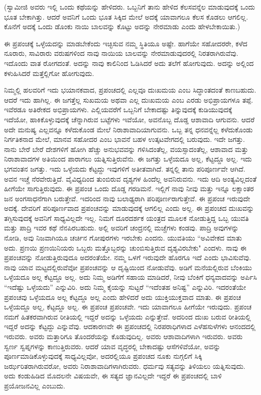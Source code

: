 (ಸ್ವಾಮೀಜಿ ಅವರು ಇಲ್ಲಿ ಒಂದು ಕಥೆಯನ್ನು ಹೇಳಿದರು. ಒಬ್ಬನಿಗೆ ತಾನು ಹೇಳಿದ ಕೆಲಸವನ್ನೆಲ ಮಾಡುವುದಕ್ಕೆ ಒಂದು ಭೂತ ಬೇಕಾಗಿತ್ತು. ಆದರೆ ಅವನಿಗೆ ಒಂದು ಭೂತ ಸಿಕ್ಕಿದ ಮೇಲೆ ಅದಕ್ಕೆ ಯಾವಾಗಲೂ ಕೆಲಸ ಕೊಡಲು ಆಗಲಿಲ್ಲ. ಕೊನೆಗೆ ಅದಕ್ಕೆ ಒಂದು ಡೊಂಕು ನಾಯಿ ಬಾಲವನ್ನು ಕೊಟ್ಟು ಅದನ್ನು ನೇರಮಾಡು ಎಂದು ಹೇಳಬೇಕಾಯಿತು.)

ಈ ಪ್ರಪಂಚಕ್ಕೆ ಒಳ್ಳೆಯದನ್ನು ಮಾಡಬೇಕೆಂದು ಇಚ್ಛಿಸುವ ನಮ್ಮ ಸ್ಥಿತಿಯೂ ಅಷ್ಟೇ. ಹಾಗೆಯೇ ಸಹೋದರರೇ, ಕಳೆದ ನೂರಾರು, ಸಾವಿರಾರು ವರುಷಗಳಿಂದ ನಾವು ನಾಯಿಯ ಬಾಲವನ್ನು ನೇರಮಾಡುವುದರಲ್ಲಿ ನಿರತರಾಗಿರುವೆವು. ಇದೊಂದು ವಾತ ರೋಗದಂತೆ. ಅದನ್ನು ನಾವು ಕಾಲಿನಿಂದ ಓಡಿಸಿದರೆ ಅದು ತಲೆಗೆ ಹೋಗುವುದು. ಅದನ್ನು ಅಲ್ಲಿಂದ ಕಳುಹಿಸಿದರೆ ಮತ್ತೆಲ್ಲಿಗೋ ಹೋಗುವುದು.

ನಿಮ್ಮಲ್ಲಿ ಹಲವರಿಗೆ ಇದು ಭಯಾನಕವಾದ, ಪ್ರಪಂಚದಲ್ಲಿ ಎಲ್ಲವೂ ದುಃಖಮಯ ಎಂಬ ಸಿದ್ಧಾಂತದಂತೆ ಕಾಣಬಹುದು. ಆದರೆ ಇದು ಹಾಗಿಲ್ಲ. ಈ ಜಗತ್ತೆಲ್ಲ ಸುಖಮಯ ಅಥವಾ ಎಲ್ಲ ದುಃಖಮಯ ಎಂಬ ಎರಡು ಅಭಿಪ್ರಾಯಗಳೂ ತಪ್ಪೆ. ಇವೆರಡೂ ಅತಿರೇಕದ ಅಭಿಪ್ರಾಯಗಳು. ಎಲ್ಲಿಯವರೆಗೆ ಒಬ್ಬನಿಗೆ ಬೇಕಾದಷ್ಟು ತಿನ್ನುವುದಕ್ಕೆ ಕುಡಿಯುವುದಕ್ಕೆ ಇದೆಯೋ, ಹಾಕಿಕೊಳ್ಳುವುದಕ್ಕೆ ಚೆನ್ನಾಗಿರುವ ಬಟ್ಟೆಗಳು ಇವೆಯೋ, ಅವನೊಬ್ಬ ದೊಡ್ಡ ಆಶಾವಾದಿ ಆಗುವನು. ಆದರೆ ಅದೇ ಮನುಷ್ಯ ಎಲ್ಲವನ್ನೂ ಕಳೆದುಕೊಂಡ ಮೇಲೆ ನಿರಾಶಾವಾದಿಯಾಗುವನು. ಒಬ್ಬ ತನ್ನ ಧನವನ್ನೆಲ್ಲ ಕಳೆದುಕೊಂಡು ನಿರ್ಗತಿಕನಾದ ಮೇಲೆ, ಮಾನವ ಸಹೋದರ ಎಂಬ ಭಾವನೆ ಬಹಳ ಉತ್ಕಟವೇಗದಲ್ಲಿ ಬರುವುದು. ಇದೇ ಜಗತ್ತು. ನಾನು ಬೇರೆ ಬೇರೆ ದೇಶಗಳಿಗೆ ಹೋಗಿ ಹೆಚ್ಚು ಅನುಭವವನ್ನು ಗಳಿಸಿದಂತೆಲ್ಲ, ವಯಸ್ಸಾದಂತೆಲ್ಲ, ಆಶಾವಾದ ಮತ್ತು ನಿರಾಶಾವಾದಗಳ ಅತಿಯಿಂದ ಪಾರಾಗಲು ಯತ್ನಿಸುತ್ತಿರುವೆನು. ಈ ಜಗತ್ತು ಒಳ್ಳೆಯದೂ ಅಲ್ಲ, ಕೆಟ್ಟದ್ದೂ ಅಲ್ಲ. ಇದು ಭಗವಂತನ ಜಗತ್ತು. ಇದು ಒಳ್ಳೆಯದು ಕೆಟ್ಟದ್ದು ಇವುಗಳಿಗೆ ಅತೀತವಾಗಿದೆ. ತನ್ನಲ್ಲಿ ತಾನು ಪರಿಪೂರ್ಣವೇ ಆಗಿದೆ. ಅವನ ಇಚ್ಚೆ ನೆರವೇರುತ್ತಿದೆ. ವೈವಿಧ್ಯದಿಂದ ತುಂಬಿರುವ ದೃಶ್ಯಗಳ ಹಿಂದೆಲ್ಲ ಅವನಿರುವನು. ಇದು ಆದಿ ಅಂತ್ಯವಿಲ್ಲದಂತೆ ಹೀಗೆಯೇ ಸಾಗುತ್ತಿರುವುದು. ಈ ಪ್ರಪಂಚ ಒಂದು ದೊಡ್ಡ ಗರಡಿಮನೆ. ಇಲ್ಲಿಗೆ ನಾವು ನೀವು ಮತ್ತು ಇನ್ನೂ ಲಕ್ಷಾಂತರ ಜನ ಅಂಗಸಾಧನೆಗಾಗಿ ಬರುತ್ತೇವೆ. ಇದರಿಂದ ನಾವು ಬಲಾಢ್ಯರಾಗಿ ಪರಿಪೂರ್ಣರಾಗುತ್ತೇವೆ. ಈ ಪ್ರಪಂಚ ಇರುವುದೇ ಅದಕ್ಕೆ. ದೇವರಿಗೆ ಪರಿಪೂರ್ಣವಾದ ಪ್ರಪಂಚವನ್ನು ಮಾಡುವುದಕ್ಕೆ ಆಗಲಿಲ್ಲ ಎಂದು ಅಲ್ಲ. ಈ ಪ್ರಪಂಚದ ದುಃಖವನ್ನು ತಗ್ಗಿಸುವುದಕ್ಕೆ ಅವನಿಗೆ ಸಾಧ್ಯವಿಲ್ಲದೇ ಇಲ್ಲ. ನಿಮಗೆ ದೂರದರ್ಶಕ ಯಂತ್ರದ ಮೂಲಕ ನೋಡುತ್ತಿದ್ದ ಒಬ್ಬ ಯುವತಿ ಮತ್ತು ಪಾದ್ರಿ ಇವರ ಕಥೆ ನೆನಪಿರಬಹುದು. ಅಲ್ಲಿ ಅವರಿಗೆ ಚಂದ್ರನಲ್ಲಿ ಮಚ್ಚೆಗಳು ಕಂಡವು. ಪಾದ್ರಿ ಅವುಗಳನ್ನು ನೋಡಿ, ಅವು ನಿಜವಾಗಿಯೂ ಚರ್ಚಿನ ಗೋಪುರಗಳು ಇರಬೇಕು ಎಂದನು. ಯುವತಿಯು “ಅವಿವೇಕದ ಮಾತು ಅದು. ಪ್ರಣಯಿ ಪ್ರಣಯಿನಿಯರು ಒಬ್ಬರು ಮತ್ತೊಬ್ಬರನ್ನು ಚುಂಬಿಸುತ್ತಿರುವ ದೃಶ್ಯವಿರಬೇಕು" ಎಂದಳು. ನಾವು ಈ ಪ್ರಪಂಚವನ್ನು ನೋಡುತ್ತಿರುವುದೂ ಅದರಂತೆಯೇ. ನಮ್ಮ ಒಳಗೆ ಇರುವುದೇ ಹೊರಗೂ ಇದೆ ಎಂದು ಭಾವಿಸುವೆವು. ನಾವು ಯಾವ ಮಟ್ಟದಲ್ಲಿರುವೆವೋ ಪ್ರಪಂಚವನ್ನು ಆ ದೃಷ್ಟಿಯಿಂದ ನೋಡುವೆವು. ಅಡಿಗೆ ಮನೆಯಲ್ಲಿರುವ ಬೆಂಕಿಯು ಒಳ್ಳೆಯದೂ ಅಲ್ಲ ಕೆಟ್ಟದ್ದೂ ಅಲ್ಲ. ಅದು ನಿಮ್ಮ ಅಡಿಗೆಗೆ ಸಹಾಯ ಮಾಡಿದರೆ, ನೀವು ಬೆಂಕಿಗೆ ಧನ್ಯವಾದವನ್ನು ಅರ್ಪಿಸಿ “ಇದೆಷ್ಟು ಒಳ್ಳೆಯದು'' ಎನ್ನುವಿರಿ. ಅದು ನಿಮ್ಮ ಕೈಯನ್ನು ಸುಟ್ಟರೆ “ಇದೆಂತಹ ಅನಿಷ್ಟ'' ಎನ್ನುವಿರಿ. ಇದರಂತೆಯೇ ಪ್ರಪಂಚವು ಒಳ್ಳೆಯದೂ ಅಲ್ಲ ಕೆಟ್ಟದ್ದೂ ಅಲ್ಲ ಎಂದು ಹೇಳಿದರೆ ಅದು ಯುಕ್ತಿಯುಕ್ತವಾದ ಮಾತು. ಈ ಪ್ರಪಂಚ ಒಳ್ಳೆಯದ್ದೂ ಅಲ್ಲ, ಕೆಟ್ಟದ್ದೂ ಅಲ್ಲ. ಈ ಪ್ರಪಂಚ ಪ್ರಪಂಚವೇ. ಇದು ಯಾವಾಗಲೂ ಹೀಗೆಯೇ ಇರುವುದು. ಪ್ರಪಂಚ ನಮಗೆ ಹಿತಕರವಾಗಿರುವ ರೀತಿಯಲ್ಲಿ ಇದ್ದರೆ ಅದನ್ನು ಒಳ್ಳೆಯದು ಎನ್ನುತ್ತೇವೆ. ಅದರಿಂದ ದುಃಖ ಬರುವ ರೀತಿಯಲ್ಲಿ ಇದ್ದರೆ ಅದನ್ನು ಕೆಟ್ಟದ್ದು ಎನ್ನುವೆವು. ಆದಕಾರಣವೇ ಈ ಪ್ರಪಂಚದಲ್ಲಿ ನಿರಪರಾಧಿಗಳಾದ ಎಳೆಹಸುಳೆಗಳು ಆನಂದದಲ್ಲಿ ಇರುವರು. ಅವರು ಮತ್ತಾರಿಗೂ ತೊಂದರೆಯನ್ನು ಕೊಡುವುದಿಲ್ಲ. ಅವರು ಆಶಾವಾದಿಗಳಾಗಿ ಇರುವರು. ಅವರು ಸ್ವರ್ಣ ಸ್ವಪ್ನಗಳನ್ನು ಕಾಣುತ್ತಿರುವರು. ಆದರೆ ಯಾವ ವೃದ್ಧರಲ್ಲಿ ಬೇಕಾದಷ್ಟು ಆಸೆಗಳಿವೆಯೋ, ಅವನ್ನು ಪೂರ್ಣಮಾಡಿಕೊಳ್ಳುವುದಕ್ಕೆ ಸಾಧ್ಯವಿಲ್ಲವೋ, ಅದರಲ್ಲಿಯೂ ಪ್ರಪಂಚದ ನೂಕು ನುಗ್ಗಲಿಗೆ ಸಿಕ್ಕಿ ಜರ್ಝರಿತರಾಗಿರುವರೋ, ಅವರು ನಿರಾಶಾವಾದಿಗಳಾಗಿರುವರು. ಧರ್ಮವು ಸತ್ಯವನ್ನು ತಿಳಿಯಲು ಯತ್ನಿಸುವುದು. ಅದು ಕಂಡುಹಿಡಿದ ಮೊದಲನೇ ವಿಷಯವೇ, ಈ ಸತ್ಯದ ಜ್ಞಾನವಿಲ್ಲದೇ ಇದ್ದರೆ ಈ ಪ್ರಪಂಚದಲ್ಲಿ ಬಾಳಿ ಪ್ರಯೋಜನವಿಲ್ಲ ಎಂಬುದು.


